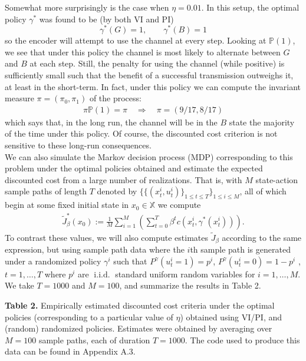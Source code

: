 \documentclass[10pt]{article}
\newcommand{\bp}[1]{\left({#1}\right)}
\newcommand{\mbb}[1]{\mathbb{#1}}
\newcommand{\1}[1]{\mathbbm{1}_{#1}}
\DeclareMathOperator{\iid}{i.i.d.}
\begin{document}
    Somewhat more surprisingly is the case when $\eta=0.01$. In this setup, the optimal policy $\gamma^\ast$ was found to be (by both VI and PI)
    \[\gamma^\ast(G)=1,\qquad\gamma^\ast(B)=1\]
    so the encoder will attempt to use the channel at every step. Looking at $\mbb{P}(1)$, we see that under this policy the channel is most likely to alternate
    between $G$ and $B$ at each step. Still, the penalty for using the channel (while positive) is sufficiently small such that the benefit of a successful transmission outweighs it, at least in the short-term. In fact, under this policy we can compute the invariant measure $\pi=(\pi_0,\pi_1)$ of the process:
    \begin{align*}
        \pi \mbb{P}(1)=\pi\quad\Rightarrow\quad\pi=(9/17,8/17)
    \end{align*}
    which says that, in the long run, the channel will be in the $B$ state the majority of the time under this policy. Of course, the discounted cost criterion is not sensitive to these long-run consequences.\\[5pt]
    We can also simulate the Markov decision process (MDP) corresponding to this problem under the optimal policies obtained and estimate the expected discounted cost from a large number of realizations. That is, with $M$ state-action sample paths of length $T$ denoted by
    $\{\{(x^i_t,u^i_t)\}_{1\leq t\leq T}\}_{1\leq i\leq M}$, all of which begin at some fixed initial state in $x_0\in\mbb{X}$ we compute
    \begin{align*}
        \tilde{J}_\beta^\ast(x_0):=\frac{1}{M}\sum_{i=1}^M\bp{\sum_{t=0}^T\beta^tc(x^i_t,\gamma^\ast(x^i_t))}.
    \end{align*}
    To contrast these values, we will also compute estimates $\tilde{J}_\beta$ according to the same expression, but using sample path data where the $i$th sample path is generated under a randomized policy $\gamma^i$ such that $P^\gamma(u^i_t=1)=p^i$, $P^\gamma(u^i_t=0)=1-p^i$ , $t=1,\dots, T$ where $p^i$ are $\iid$ standard uniform random variables for $i=1,\dots, M$. We take $T=1000$ and $M=100$, and summarize the results in Table 2.
    \begin{center}
        \begin{minipage}{\dimexpr\paperwidth-5cm}
           {\bf Table 2.} Empirically estimated discounted cost criteria under the optimal policies (corresponding to a particular value of $\eta$) obtained using VI/PI, and (random) randomized policies. Estimates were obtained by averaging over $M=100$ sample paths, each of duration $T=1000$.
           The code used to produce this data can be found in Appendix A.3.
        \end{minipage}
    \end{center}
\end{document}

